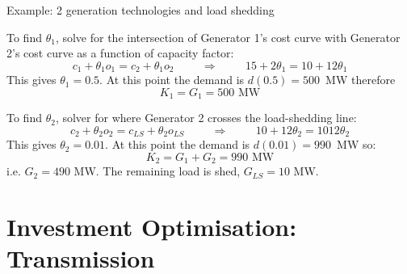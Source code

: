 \documentclass[10pt,aspectratio=169,dvipsnames]{beamer}
\begin{document}
\begin{frame}{Example: 2 generation technologies and load shedding}

  To find $\theta_1$, solve for the intersection of Generator 1's cost curve with Generator 2's cost curve as a function of capacity factor:
  \begin{equation*}
    c_1 + \theta_1 o_1 = c_2 + \theta_1 o_2 \hspace{1cm} \Rightarrow  \hspace{1cm} 15 + 2 \theta_1 = 10 + 12 \theta_1
  \end{equation*}
  This gives $\theta_1 = 0.5$. At this point the demand is $d(0.5) = 500$~MW therefore
  \begin{equation*}
    K_1 = G_1 = 500\textrm{ MW}
  \end{equation*}

  To find $\theta_2$, solver for where Generator 2 crosses the load-shedding line:
  \begin{equation*}
    c_2 + \theta_2 o_2 = c_{LS} + \theta_2 o_{LS} \hspace{1cm} \Rightarrow  \hspace{1cm} 10 + 12 \theta_2 = 1012 \theta_2
  \end{equation*}
  This gives $\theta_2 = 0.01$. At this point the demand is $d(0.01) = 990$~MW so:
  \begin{equation*}
    K_2 =     G_1 + G_2 = 990\textrm{ MW}
  \end{equation*}
  i.e. $G_2 = 490$ MW. The remaining load is shed, $G_{LS} = 10$ MW.

\end{frame}

\section{Investment Optimisation: Transmission}
\end{document}
